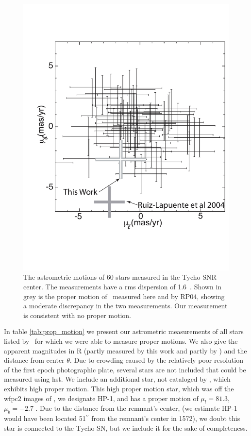 \begin{figure}[tb]
	\centering
	\includegraphics[width=\textwidth]{chapter_sn1572_starg/plots/prop_motion_compare_subaru.pdf}
\caption[Proper motion measurements for stars in SN 1572 from plates and HST images]{The astrometric motions of 60 stars measured in the Tycho SNR
center. The measurements have a \gls{rms} dispersion of 1.6~\masyr. Shown
in grey is the proper motion of \starg\ measured here and by RP04, showing a moderate discrepancy in the two measurements. Our measurement is consistent with no proper motion. }
\label{fig:prop_motion}
\end{figure}

In table \ref{tab:prop_motion} we present our astrometric measurements of all stars listed by \rl\  for which we were able to measure proper motions. We also give the apparent magnitudes in R (partly measured by this work and partly by \rl) and the distance from center $\theta$. Due to crowding caused by the relatively poor resolution of the first epoch photographic plate, several stars are not included that could be measured using \gls{hst}.
We include an  additional star, not cataloged by \rl, which exhibits high proper motion. This  high proper motion star, which was off the \gls{wfpc2} images of \rl,  we designate HP-1, and has a proper motion of $\mu_l=81.3$, $\mu_b=-2.7$ \masyr. Due to the distance from the remnant's center, (we estimate HP-1 would have been located 51$^{\prime\prime}$ from the remnant's center in 1572), we doubt this star is connected to the Tycho SN, but we include it for the sake of completeness. 

